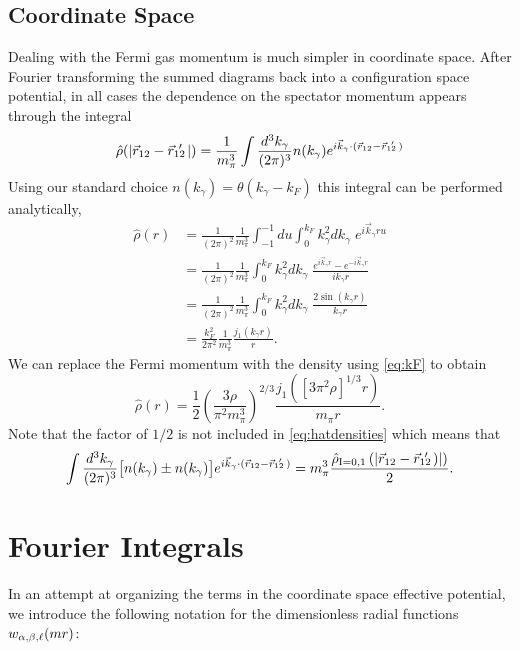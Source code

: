 \section{\label{app:rhohat}Coordinate Space}

Dealing with the Fermi gas momentum is much simpler in coordinate space. After Fourier transforming the summed diagrams back into a configuration space potential, in all cases the dependence on the spectator momentum appears through the integral
\begin{equation}
\hat{\rho}(|\vec{r}_{12}-\vec{r}_{12}\!\!\!'\,\,|) = \frac{1}{m_\pi^3}\int \frac{d^3k_\gamma}{(2\pi)^3}n(k_\gamma)e^{i\vec{k}_\gamma \cdot(\vec{r}_{12}-\vec{r}_{12}\!\!\!'\,\,)}
\end{equation}
Using our standard choice $n(k_\gamma)=\theta(k_\gamma-k_F)$ this integral can be performed analytically,
\begin{equation}\begin{split}
\hat{\rho}(r) &= \frac{1}{(2\pi)^2}\frac{1}{m_\pi^3}\int_{-1}^{-1}du \int_0^{k_F} k_\gamma^2dk_\gamma \;e^{i \vec{k}_\gamma r u} \\
&= \frac{1}{(2\pi)^2}\frac{1}{m_\pi^3} \int_0^{k_F} k_\gamma^2 dk_\gamma \;\frac{e^{i\vec{k}_\gamma r}-e^{-i\vec{k}_\gamma r}}{ik_\gamma r} \\
&= \frac{1}{(2\pi)^2}\frac{1}{m_\pi^3} \int_0^{k_F} k_\gamma^2 dk_\gamma \;\frac{2 \sin(k_\gamma r)}{k_\gamma r} \\
&= \frac{k_F^2}{2\pi^2}\frac{1}{m_\pi^3} \frac{j_1(k_\gamma r)}{r}.
\end{split}
\end{equation}
We can replace the Fermi momentum with the density using \eqref{eq:kF} to obtain
\begin{equation}
\hat{\rho}(r) = \frac{1}{2}\left(\frac{3\rho}{\pi^2 m_\pi^3}\right)^{2/3} \frac{j_1( [3\pi^2\rho]^{1/3} r)}{m_\pi r}.
\end{equation}
Note that the factor of $1/2$ is not included in \eqref{eq:hatdensities} which means that
\begin{equation}
\int \frac{d^3k_\gamma}{(2\pi)^3}\big[ n(k_\gamma)\pm n(k_\gamma)\big]e^{i\vec{k}_\gamma \cdot(\vec{r}_{12}-\vec{r}_{12}\!\!\!'\,\,)} =m_\pi^3 \frac{ \hat{\rho}_{\text{I}=0,1}\left( |\vec{r}_{12}-\vec{r}_{12}\!\!\!'\,\,)| \right)}{2}.
\end{equation}

\chapter{\label{app:wNotation} Fourier Integrals}

In an attempt at organizing the terms in the coordinate space effective potential, we introduce the following notation for the dimensionless radial functions $w_{\alpha,\beta,\ell}( m r )$:

